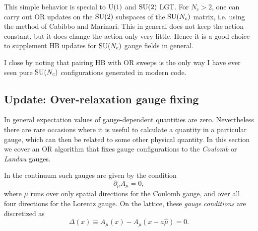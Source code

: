 This simple 
behavior is special to $\operatorname{U}(1)$ and $\operatorname{SU}(2)$ LGT. 
For $N_c>2$, one can carry out OR updates on the $\operatorname{SU}(2)$ subspaces of the
$\operatorname{SU}(N_c)$ matrix, i.e. using the method of Cabibbo and Marinari. 
This in general does not keep the action constant, but it
does change the action only very little. Hence it is a good choice to supplement
HB updates for $\operatorname{SU}(N_c)$ gauge fields in general. 

I close by noting that pairing HB with OR sweeps is the only way I have ever
seen pure $\operatorname{SU}(N_c)$ configurations generated in modern code.

\subsection{Update: Over-relaxation gauge fixing}\label{sec:ORgaugefix}

In general expectation values of gauge-dependent quantities are zero.
Nevertheless there are rare occasions where it is useful to calculate
a quantity in a particular gauge, which can then be related to some
other physical quantity. In this section we cover an OR
algorithm that fixes gauge configurations to the {\it Coulomb} or 
{\it Landau} gauges.

In the continuum such gauges are given by the condition
\begin{equation}
  \partial_\mu A_\mu=0,
\end{equation}
where $\mu$ runs over only spatial directions for the Coulomb gauge, and
over all four directions for the Lorentz gauge. On the lattice, these 
{\it gauge conditions} are discretized as
\begin{equation}
  \Delta(x)\equiv A_\mu(x)-A_\mu(x-a\hat\mu) =0.
\end{equation}

